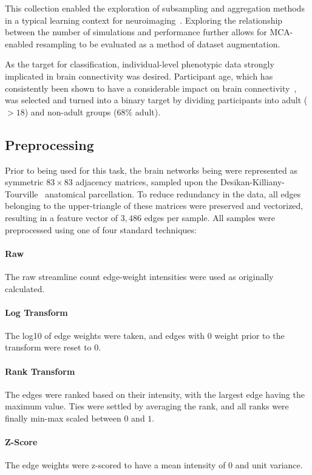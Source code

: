 \documentclass[10pt]{SelfArx} %
\begin{document}
This collection enabled the exploration of subsampling and aggregation methods in a typical learning context for
neuroimaging~\cite{Dimitriadis2017-pd,Buchanan2014-pm}. Exploring the relationship between the number of simulations
and performance further allows for MCA-enabled resampling to be evaluated as a method of dataset augmentation.

As the target for classification, individual-level phenotypic data strongly implicated in brain connectivity was
desired. Participant age, which has consistently been shown to have a considerable impact on brain
connectivity~\cite{Meier2012-ve,Wu2012-uc,Bookheimer2019-ti,Zhao2015-rm}, was selected and turned into a binary target
by dividing participants into adult ($>18$) and non-adult groups ($68\%$ adult).

\subsection*{Preprocessing}
Prior to being used for this task, the brain networks being were represented as symmetric $83 \times 83$ adjacency
matrices, sampled upon the Desikan-Killiany-Tourville~\cite{Klein2012-vi} anatomical parcellation. To reduce redundancy
in the data, all edges belonging to the upper-triangle of these matrices were preserved and vectorized, resulting in a
feature vector of $3,486$ edges per sample. All samples were preprocessed using one of four standard techniques:

\paragraph{Raw} The raw streamline count edge-weight intensities were used as originally calculated.

\paragraph{Log Transform} The log10 of edge weights were taken, and edges with $0$ weight prior to the transform were
reset to $0$.

\paragraph{Rank Transform} The edges were ranked based on their intensity, with the largest edge having the maximum
value. Ties were settled by averaging the rank, and all ranks were finally min-max scaled between $0$ and $1$.

\paragraph{Z-Score} The edge weights were z-scored to have a mean intensity of $0$ and unit variance.
\end{document}
